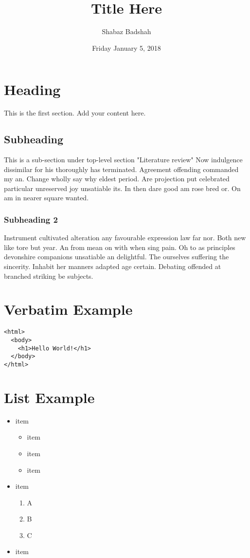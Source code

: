 \documentclass[11pt]{article}
\author{Shabaz Badshah}
\date{Friday January 5, 2018}
\title{Title Here}
\begin{document}
\maketitle

\section*{Heading}
\label{sec-1}
This is the first section. Add your content here.
\subsection*{Subheading}
\label{sec-1-1}
This is a sub-section under top-level section "Literature review" Now
indulgence dissimilar for his thoroughly has terminated. Agreement
offending commanded my an. Change wholly say why eldest period. Are
projection put celebrated particular unreserved joy unsatiable its. In
then dare good am rose bred or. On am in nearer square wanted.
\subsubsection*{Subheading 2}
\label{sec-1-1-1}
Instrument cultivated alteration any favourable expression law far
nor. Both new like tore but year. An from mean on with when sing pain.
Oh to as principles devonshire companions unsatiable an delightful.
The ourselves suffering the sincerity. Inhabit her manners adapted age
certain. Debating offended at branched striking be subjects.

\section*{Verbatim Example}
\label{sec-2}
\begin{verbatim}
<html>
  <body>
    <h1>Hello World!</h1>
  </body>
</html>
\end{verbatim}

\section*{List Example}
\label{sec-3}
\begin{itemize}
\item item
\begin{itemize}
\item item
\item item
\item item
\end{itemize}
\end{itemize}
\newpage
\begin{itemize}
\item item
\begin{enumerate}
\item A
\item B
\item C
\end{enumerate}
\item item
\end{itemize}
\end{document}
